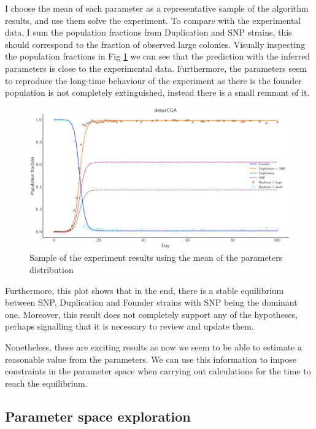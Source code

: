\documentclass{article}
\begin{document}
I choose the mean of each parameter as a representative sample of the algorithm results, and use them solve the experiment. To compare with the experimental data, I sum the population fractions from Duplication and SNP strains, this should correspond to the fraction of observed large colonies. Visually inspecting the population fractions in Fig \ref{fig:abc_3st_experiment_comparison} we can see that the prediction with the inferred parameters is close to the experimental data. Furthermore, the parameters seem to reproduce the long-time behaviour of the experiment as there is the founder population is not completely extinguished, instead there is a small remnant of it.
\begin{figure}[H]
    \centering
    \includegraphics[width=1\linewidth]{plots/abc_3st_experiment_comparison.png}
    \caption{Sample of the experiment results using the mean of the parameters distribution}
    \label{fig:abc_3st_experiment_comparison}
\end{figure}

Furthermore, this plot shows that in the end, there is a stable equilibrium between SNP, Duplication and Founder strains with SNP being the dominant one. Moreover, this result does not completely support any of the hypotheses, perhaps signalling that it is necessary to review and update them.

Nonetheless, these are exciting results as now we seem to be able to estimate a reasonable value from the parameters. We can use this information to impose constraints in the parameter space when carrying out calculations for the time to reach the equilibrium.

\subsection{Parameter space exploration}
\end{document}
